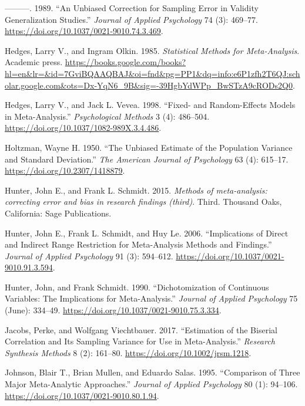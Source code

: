 \documentclass[
  letterpaper,
  DIV=11,
  numbers=noendperiod]{scrreprt}
\newlength{\cslhangindent}
\newlength{\cslentryspacingunit} %
\newenvironment{CSLReferences}[2] %
 {%
  \setlength{\parindent}{0pt}
  \ifodd #1
  \let\oldpar\par
  \def\par{\hangindent=\cslhangindent\oldpar}
  \fi
  \setlength{\parskip}{#2\cslentryspacingunit}
 }%
 {}
\begin{document}
\begin{CSLReferences}{1}{0}
\leavevmode{}%
---------. 1989. {``An Unbiased Correction for Sampling Error in
Validity Generalization Studies.''} \emph{Journal of Applied Psychology}
74 (3): 469--77. \url{https://doi.org/10.1037/0021-9010.74.3.469}.

\leavevmode{}%
Hedges, Larry V., and Ingram Olkin. 1985. \emph{Statistical Methods for
Meta-Analysis}. Academic press.
\url{https://books.google.com/books?hl=en\&lr=\&id=7GviBQAAQBAJ\&oi=fnd\&pg=PP1\&dq=info:e6P1zfh2T6QJ:scholar.google.com\&ots=Dx-YqN6_9B\&sig=-39HgbYdWPp_BwSTzA9cRODs2Q0}.

\leavevmode{}%
Hedges, Larry V., and Jack L. Vevea. 1998. {``Fixed- and Random-Effects
Models in Meta-Analysis.''} \emph{Psychological Methods} 3 (4):
486--504. \url{https://doi.org/10.1037/1082-989X.3.4.486}.

\leavevmode{}%
Holtzman, Wayne H. 1950. {``The Unbiased Estimate of the Population
Variance and Standard Deviation.''} \emph{The American Journal of
Psychology} 63 (4): 615--17. \url{https://doi.org/10.2307/1418879}.

\leavevmode{}%
Hunter, John E., and Frank L. Schmidt. 2015. \emph{Methods of
meta-analysis: correcting error and bias in research findings (third)}.
Third. Thousand Oaks, California: Sage Publications.

\leavevmode{}%
Hunter, John E., Frank L. Schmidt, and Huy Le. 2006. {``Implications of
Direct and Indirect Range Restriction for Meta-Analysis Methods and
Findings.''} \emph{Journal of Applied Psychology} 91 (3): 594--612.
\url{https://doi.org/10.1037/0021-9010.91.3.594}.

\leavevmode{}%
Hunter, John, and Frank Schmidt. 1990. {``Dichotomization of Continuous
Variables: The Implications for Meta-Analysis.''} \emph{Journal of
Applied Psychology} 75 (June): 334--49.
\url{https://doi.org/10.1037/0021-9010.75.3.334}.

\leavevmode{}%
Jacobs, Perke, and Wolfgang Viechtbauer. 2017. {``Estimation of the
Biserial Correlation and Its Sampling Variance for Use in
Meta-Analysis.''} \emph{Research Synthesis Methods} 8 (2): 161--80.
\url{https://doi.org/10.1002/jrsm.1218}.

\leavevmode{}%
Johnson, Blair T., Brian Mullen, and Eduardo Salas. 1995. {``Comparison
of Three Major Meta-Analytic Approaches.''} \emph{Journal of Applied
Psychology} 80 (1): 94--106.
\url{https://doi.org/10.1037/0021-9010.80.1.94}.


\end{CSLReferences}
\end{document}
